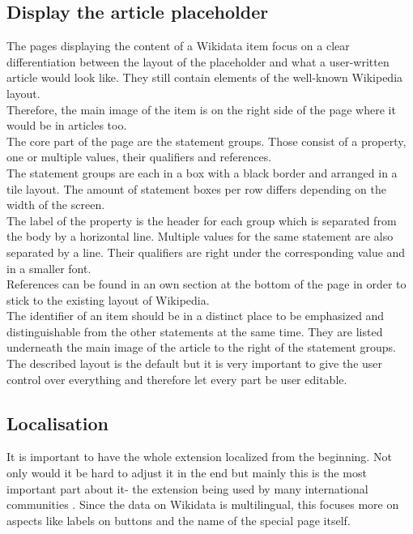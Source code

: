 \documentclass[11pt]{article}
\begin{document}
\subsection{Display the article placeholder}
The pages displaying the content of a Wikidata item focus on a clear differentiation between the layout of the placeholder and what a user-written article would look like. They still contain elements of the well-known Wikipedia layout. \\
Therefore, the main image of the item is on the right side of the page where it would be in articles too.\\
The core part of the page are the statement groups. Those consist of a property, one or multiple values, their qualifiers and references. \\
The statement groups are each in a box with a black border and arranged in a tile layout. The amount of statement boxes per row differs depending on the width of the screen. \\
The label of the property is the header for each group which is separated from the body by a horizontal line. Multiple values for the same statement are also separated by a line. Their qualifiers are right under the corresponding value and in a smaller font. \\
References can be found in an own section at the bottom of the page in order to stick to the existing layout of Wikipedia. \\
The identifier of an item should be in a distinct place to be emphasized and distinguishable from the other statements at the same time. They are listed underneath the main image of the article to the right of the statement groups. \\
The described layout is the default but it is very important to give the user control over everything and therefore let every part be user editable. \\

\subsection{Localisation}
It is important to have the whole extension localized from the beginning. Not only would it be hard to adjust it in the end but mainly this is the most important part about it- the extension being used by many international communities%
. Since the data on Wikidata is multilingual, this focuses more on aspects like labels on buttons and the name of the special page itself. \\
\end{document}
